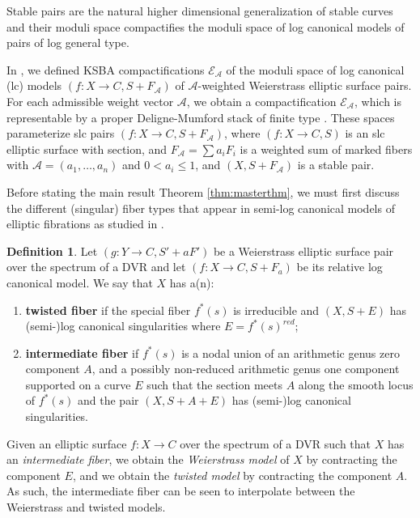 \documentclass[11pt]{amsart}
\theoremstyle{definition}
\newtheorem{definition}[theorem]{Definition}
\theoremstyle{remark}
\newcommand{\calA}{\mathcal A}
\newcommand{\calE}{\mathcal E}
\begin{document}
	Stable pairs are the natural higher dimensional generalization of stable curves and their moduli space compactifies the moduli space of log canonical models of pairs of log general type. 
	
	In \cite{master}, we defined KSBA compactifications $\calE_\calA$ of the moduli space of log canonical (lc) models $(f: X \to C, S + F_\calA)$ of $\calA$-weighted Weierstrass elliptic surface pairs. For each admissible weight vector $\calA$, we obtain a compactification $\calE_\calA$, which is representable by a proper Deligne-Mumford stack of finite type \cite[Theorem 1.1 \& 1.2]{master}. These spaces parameterize slc pairs $(f: X \to C, S + F_{\calA})$, where $(f: X \to C, S)$ is an slc elliptic surface with section, and $F_{\calA} = \sum a_i F_i$ is a weighted sum of marked fibers with $\calA = (a_1, \dots, a_n)$ and $0 < a_i \leq 1$, and $(X , S + F_\calA)$ is a stable pair. 
	
	Before stating the main result Theorem \ref{thm:masterthm}, we must first discuss the different (singular) fiber types that appear in semi-log canonical models of elliptic fibrations as studied in \cite{calculations}. 
	
	\begin{definition}\label{def:fibertypes} Let $(g: Y \to C, S' + aF')$ be a Weierstrass elliptic surface pair over the spectrum of a DVR and let $(f: X \to C, S + F_a)$ be its relative log canonical model. We say that $X$ has a(n):  
		\begin{enumerate} 
			\item \textbf{twisted fiber} if the special fiber $f^*(s)$ is irreducible and $(X,S + E)$ has (semi-)log canonical singularities where $E = f^*(s)^{red}$;   
			\item \textbf{intermediate fiber} if $f^*(s)$ is a nodal union of an arithmetic genus zero component $A$, and a possibly non-reduced arithmetic genus one component supported on a curve $E$ such that the section meets $A$ along the smooth locus of $f^*(s)$ and the pair $(X, S + A + E)$ has (semi-)log canonical singularities. 
		\end{enumerate} 
	\end{definition}
	
	Given an elliptic surface $f: X \to C$ over the spectrum of a DVR such that $X$ has an \emph{intermediate fiber}, we obtain the \emph{Weierstrass model}  of $X$ by contracting the component $E$, and we obtain the \emph{twisted model} by contracting the component $A$. As such, the intermediate fiber can be seen to interpolate between the Weierstrass and twisted models. 
	
\end{document}

